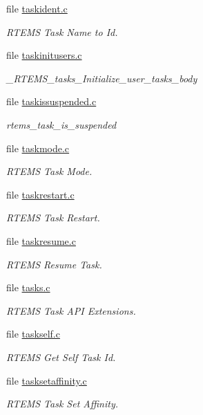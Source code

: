 \begin{DoxyCompactItemize}
file \mbox{\hyperlink{taskident_8c}{taskident.\+c}}
\begin{DoxyCompactList}\small\item\em R\+T\+E\+MS Task Name to Id. \end{DoxyCompactList}\item 
file \mbox{\hyperlink{taskinitusers_8c}{taskinitusers.\+c}}
\begin{DoxyCompactList}\small\item\em \+\_\+\+R\+T\+E\+M\+S\+\_\+tasks\+\_\+\+Initialize\+\_\+user\+\_\+tasks\+\_\+body \end{DoxyCompactList}\item 
file \mbox{\hyperlink{taskissuspended_8c}{taskissuspended.\+c}}
\begin{DoxyCompactList}\small\item\em rtems\+\_\+task\+\_\+is\+\_\+suspended \end{DoxyCompactList}\item 
file \mbox{\hyperlink{taskmode_8c}{taskmode.\+c}}
\begin{DoxyCompactList}\small\item\em R\+T\+E\+MS Task Mode. \end{DoxyCompactList}\item 
file \mbox{\hyperlink{taskrestart_8c}{taskrestart.\+c}}
\begin{DoxyCompactList}\small\item\em R\+T\+E\+MS Task Restart. \end{DoxyCompactList}\item 
file \mbox{\hyperlink{taskresume_8c}{taskresume.\+c}}
\begin{DoxyCompactList}\small\item\em R\+T\+E\+MS Resume Task. \end{DoxyCompactList}\item 
file \mbox{\hyperlink{tasks_8c}{tasks.\+c}}
\begin{DoxyCompactList}\small\item\em R\+T\+E\+MS Task A\+PI Extensions. \end{DoxyCompactList}\item 
file \mbox{\hyperlink{taskself_8c}{taskself.\+c}}
\begin{DoxyCompactList}\small\item\em R\+T\+E\+MS Get Self Task Id. \end{DoxyCompactList}\item 
file \mbox{\hyperlink{tasksetaffinity_8c}{tasksetaffinity.\+c}}
\begin{DoxyCompactList}\small\item\em R\+T\+E\+MS Task Set Affinity. \end{DoxyCompactList}\item 

\end{DoxyCompactItemize}
